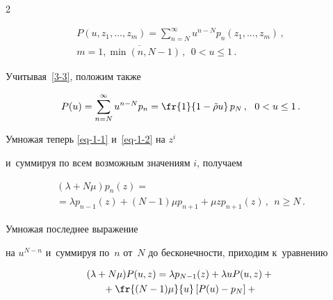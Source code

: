 \begin{multicols}{2}
\vspace*{-24pt}





\noindent


\begin{multline*}


P(u,z_1,\ldots,z_m) = \sum\limits_{n=N}^{\infty} u^{n-N} p_{n}(z_1,\ldots,z_m)\,, \\ 


m=\overline{1,\min(n,N-1)}\,,  \ \ 0< u \le 1\,.


\end{multline*}


Учитывая~\eqref{3-3}, положим также


$$ 


P(u) = \sum\limits_{n=N}^{\infty} u^{n-N} p_{n} =


\fr{1}{1 - \tilde{\rho} u}\, p_N \,, \ \ 0< u \le 1\,.


$$





Умножая теперь \eqref{eq-1-1} и~\eqref{eq-1-2} на $z^i$ 


и~суммируя по всем возможным значениям $i$, получаем


\begin{multline*}




(\lambda+N\mu) p_{n}(z) = {}\\


{}=\lambda p_{n-1}(z) + (N-1) \mu p_{n+1} 


+


\mu z p_{n+1}(z) \,,\ \ n\ge N\,.


\end{multline*}


Умножая последнее выражение




на $u^{N-n}$ и~суммируя по~$n$ от~$N$ до бесконечности, приходим к~уравнению


\begin{multline}


\label{eq-z-2}


(\lambda+N\mu) P(u,z) = \lambda p_{N-1}(z) +


\lambda u P(u,z) + {}\\


{}+\fr{(N-1) \mu}{u} \left[P(u) - p_{N}\right]


+ {}\\



\end{multline}
\end{multicols}
